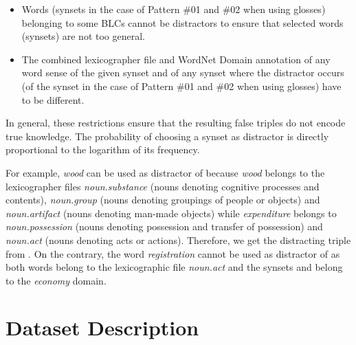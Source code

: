 \documentclass[11pt]{article}
\newcommand{\WORDNET}{WordNet}
\begin{document}
\begin{itemize}
\item Words (synsets in the case of Pattern \#01 and \#02 when using glosses) belonging to some BLCs cannot be distractors to ensure that selected words (synsets) are not too general.
\item The combined lexicographer file and \WORDNET{} Domain annotation of any word sense of the given synset and of any synset where the distractor occurs (of the synset in the case of Pattern \#01 and \#02 when using glosses) have to be different.
\end{itemize}
In general, these restrictions ensure that the resulting false triples do not encode true knowledge. The probability of choosing a synset as distractor is directly proportional to the logarithm of its frequency.

For example, {\it wood} can be used as distractor of  because {\it wood} belongs to the lexicographer files {\it noun.substance} (nouns denoting cognitive processes and contents), {\it noun.group} (nouns denoting groupings of people or objects) and {\it noun.artifact} (nouns denoting man-made objects) while {\it expenditure} belongs to {\it noun.possession} (nouns denoting possession and transfer of possession) and {\it noun.act} (nouns denoting acts or actions). Therefore, we get the distracting triple  from . On the contrary, the word {\it registration} cannot be used as distractor of  as both words belong to the lexicographic file {\it noun.act} and the synsets  and  belong to the {\it economy} domain.


\section{Dataset Description} \label{section:DatasetDescription}

\end{document}
